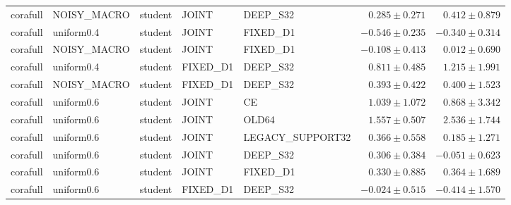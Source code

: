 \begin{longtable}{lllllrr}
corafull & NOISY\_MACRO & student & JOINT & DEEP\_S32 & $0.285 \pm 0.271$ & $0.412 \pm 0.879$ \\
corafull & uniform0.4 & student & JOINT & FIXED\_D1 & $-0.546 \pm 0.235$ & $-0.340 \pm 0.314$ \\
corafull & NOISY\_MACRO & student & JOINT & FIXED\_D1 & $-0.108 \pm 0.413$ & $0.012 \pm 0.690$ \\
corafull & uniform0.4 & student & FIXED\_D1 & DEEP\_S32 & $0.811 \pm 0.485$ & $1.215 \pm 1.991$ \\
corafull & NOISY\_MACRO & student & FIXED\_D1 & DEEP\_S32 & $0.393 \pm 0.422$ & $0.400 \pm 1.523$ \\
corafull & uniform0.6 & student & JOINT & CE & $1.039 \pm 1.072$ & $0.868 \pm 3.342$ \\
corafull & uniform0.6 & student & JOINT & OLD64 & $1.557 \pm 0.507$ & $2.536 \pm 1.744$ \\
corafull & uniform0.6 & student & JOINT & LEGACY\_SUPPORT32 & $0.366 \pm 0.558$ & $0.185 \pm 1.271$ \\
corafull & uniform0.6 & student & JOINT & DEEP\_S32 & $0.306 \pm 0.384$ & $-0.051 \pm 0.623$ \\
corafull & uniform0.6 & student & JOINT & FIXED\_D1 & $0.330 \pm 0.885$ & $0.364 \pm 1.689$ \\
corafull & uniform0.6 & student & FIXED\_D1 & DEEP\_S32 & $-0.024 \pm 0.515$ & $-0.414 \pm 1.570$ \\
\end{longtable}
